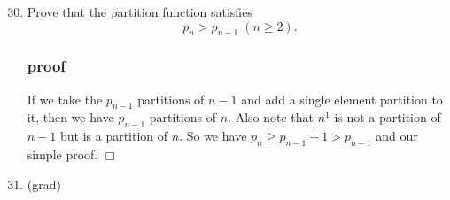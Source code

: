 \documentclass{article}
\begin{document}
\begin{enumerate}
  \setcounter{enumi}{29}
  \item
  Prove that the partition function satisfies
  \[p_n>p_{n-1}\;(n\ge2).\]
  \subsubsection*{proof}
  If we take the $p_{n-1}$ partitions of $n-1$ and add a single element partition to it, then we have $p_{n-1}$ partitions of $n$. Also note that $n^1$ is not a partition of $n-1$ but is a partition of $n$. So we have $p_n\ge {p_{n-1}+1}>p_{n-1}$ and our simple proof. $\Box$
  \setcounter{enumi}{28}
  \item (grad)
\end{enumerate}
\end{document}

